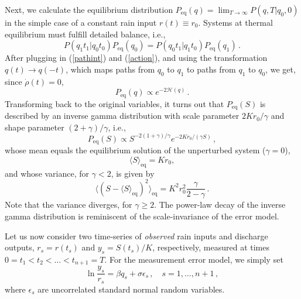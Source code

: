 \documentclass[11pt, a4paper]{article}
\newcommand{\eq}{\text{eq}}
\begin{document}
Next, we calculate the equilibrium distribution $P_{\text{eq}}(q) = \lim_{T\rightarrow\infty} P(q,T|q_0,0)$ in the simple case of a constant rain input $r(t)\equiv r_{0}$. Systems at thermal equilibrium must fulfill detailed balance, i.e.,
\begin{equation}\label{detailed_balance}
P(q_1 t_1 | q_0 t_0 ) P_{\text{eq}}(q_0) = P(q_0 t_1 | q_1 t_0 ) P_{\text{eq}}(q_1) \,.
\end{equation}
After plugging in (\ref{pathint}) and (\ref{action}), and using the transformation $q(t) \rightarrow q(-t)$, which maps paths from $q_0$ to $q_1$ to paths from $q_1$ to $q_0$, we get, since $\dot\rho(t)= 0$,
\begin{equation}\label{Peq}
  P_{\text{eq}}(q)
  \propto
  e^{-2\mathcal{H}(q)}\,.
\end{equation}
Transforming back to the original variables, it turns out that $P_{\text{eq}}(S)$ is described by an inverse gamma distribution with scale parameter $2Kr_{0}/\gamma$ and shape parameter $(2+\gamma)/\gamma$, i.e.,
\begin{equation}\label{inverse_gamma}
  P_{\text{eq}}(S)
  \propto
  S^{-2(1+\gamma)/\gamma}e^{-2Kr_{0}/(\gamma S)}\,,
\end{equation}
whose mean equals the equilibrium solution of the unperturbed system ($\gamma=0$),
\begin{equation}
  \langle S\rangle_{\eq}=Kr_{0},
\end{equation}
and whose variance, for $\gamma< 2$, is given by
\begin{equation}
  \langle (S - \langle S\rangle_{\eq})^2\rangle_{\eq}
  =
  K^2r_{0}^2
  \frac{\gamma}{2-\gamma}\,.
\end{equation}
Note that the variance diverges, for $\gamma\geq 2$.
The power-law decay of the inverse gamma distribution is reminiscent of the scale-invariance of the error model.


Let us now consider two time-series of {\em observed} rain inputs and discharge outputs, $r_s=r(t_s)$ and $y_s=S(t_s)/K$, respectively, measured at times $0=t_1<t_2<\dots < t_{n+1}=T$.
For the measurement error model, we simply set
\begin{equation}\label{data}
  \ln\frac{y_s}{r_s}
  =
  \beta q_s
  +
  \sigma\epsilon_s\,,\quad s=1,\dots,n+1\,,
\end{equation}
where $\epsilon_s$ are uncorrelated standard normal random variables.
\end{document}
